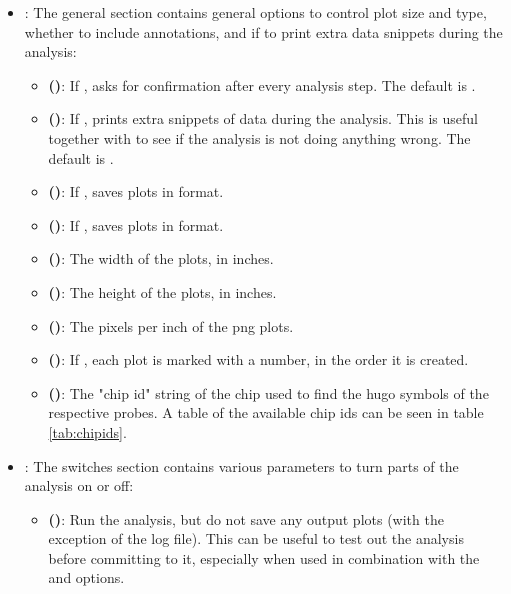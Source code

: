 \begin{itemize}
    \item \textbf{}: The general section contains general options to control plot size and type, whether to include annotations, and if to print extra data snippets during the analysis:
    \begin{itemize}
        \item \textbf{ ()}: If , asks for confirmation after every analysis step. The default is .
        \item \textbf{ ()}: If , prints extra snippets of data during the analysis. This is useful together with  to see if the analysis is not doing anything wrong. The default is .
        \item \textbf{ ()}: If , saves plots in  format.
        \item \textbf{ ()}: If , saves plots in  format.
        \item \textbf{ ()}: The width of the plots, in inches.
        \item \textbf{ ()}: The height of the plots, in inches.
        \item \textbf{ ()}: The pixels per inch of the png plots.
        \item \textbf{ ()}: If , each plot is marked with a number, in the order it is created.
        \item \textbf{ ()}: The "chip id" string of the chip used to find the \gls{hugo} symbols of the respective probes. A table of the available chip ids can be seen in table \ref{tab:chipids}.
    \end{itemize}
    \item \textbf{}: The switches section contains various parameters to turn parts of the analysis on or off:
    \begin{itemize}
        \item \textbf{ ()}: Run the analysis, but do not save any output plots (with the exception of the log file). This can be useful to test out the analysis before committing to it, especially when used in combination with the  and  options.

\end{itemize}
\end{itemize}
